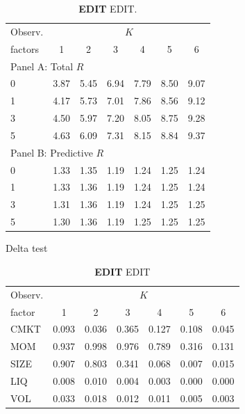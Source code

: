 \documentclass[
  12pt,
  a4paper,
  openany]{scrbook}
\begin{document}
\begin{table}
\centering
\small
\caption[EDIT]%
{%
\textbf{EDIT}
EDIT. 
}
\label{tbl-model_comparison_AB}
\vspace{5pt} %
\begin{tabular}{lcccccc}
\toprule
\multicolumn{1}{c}{Observ.} & \multicolumn{6}{c}{$K$} \\
\cmidrule(lr){2-7}
factors & 1 & 2 & 3 & 4 & 5 & 6 \\
\midrule
\multicolumn{7}{l}{Panel A: Total $R$} \\
\midrule
0 & 3.87 & 5.45 & 6.94 & 7.79 & 8.50 & 9.07 \\ 
1 & 4.17 & 5.73 & 7.01 & 7.86 & 8.56 & 9.12 \\
3 & 4.50 & 5.97 & 7.20 & 8.05 & 8.75 & 9.28 \\
5 & 4.63 & 6.09 & 7.31 & 8.15 & 8.84 & 9.37 \\
\midrule
\multicolumn{7}{l}{Panel B: Predictive $R$} \\
\midrule
0 & 1.33 & 1.35 & 1.19 & 1.24 & 1.25 & 1.24 \\
1 & 1.33 & 1.36 & 1.19 & 1.24 & 1.25 & 1.24 \\
3 & 1.31 & 1.36 & 1.19 & 1.24 & 1.25 & 1.25 \\
5 & 1.30 & 1.36 & 1.19 & 1.25 & 1.25 & 1.25 \\
\bottomrule
\end{tabular}
\end{table}

Delta test

\begin{table}
\centering
\small
\caption[Individual significance test]%
{%
\textbf{EDIT}
EDIT
}
\label{tbl-model_comparison_C}
\vspace{5pt} %
\begin{tabular}{lcccccc}
\toprule
\multicolumn{1}{c}{Observ.} & \multicolumn{6}{c}{$K$} \\
\cmidrule(lr){2-7}
factor & 1 & 2 & 3 & 4 & 5 & 6 \\
\midrule
CMKT & 0.093 & \cellcolor{green!20}0.036 & 0.365 & 0.127 & 0.108 & \cellcolor{green!20}0.045 \\
MOM  & 0.937 & 0.998 & 0.976 & 0.789 & 0.316 & 0.131 \\
SIZE & 0.907 & 0.803 & 0.341 & 0.068 & \cellcolor{green!20}0.007 & \cellcolor{green!20}0.015 \\
LIQ  & \cellcolor{green!20}0.008 & \cellcolor{green!20}0.010 & \cellcolor{green!20}0.004 & \cellcolor{green!20}0.003 & \cellcolor{green!20}0.000 & \cellcolor{green!20}0.000 \\
VOL  & \cellcolor{green!20}0.033 & \cellcolor{green!20}0.018 & \cellcolor{green!20}0.012 & \cellcolor{green!20}0.011 & \cellcolor{green!20}0.005 & \cellcolor{green!20}0.003 \\
\bottomrule
\end{tabular}
\end{table}
\end{document}
